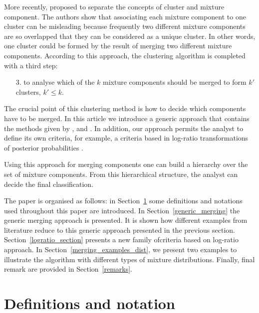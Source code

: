 \documentclass[10pt, a4paper]{article}
\begin{document}
\begin{spacing}{1.9}
More recently, \cite{lee2004combining,hennig2010methods,baudry2010combining,melnykov2013distribution,pastore2013merging} proposed to separate the concepts of cluster and mixture component. The authors show that associating each mixture component to one cluster can be misleading because frequently two different mixture components are so overlapped that they can be considered as a unique cluster. In other words, one cluster could be formed by the result of merging two different mixture components. According to this approach, the clustering algorithm is completed with a third step:

\begin{itemize}
\item[3.] to analyse which of the $k$ mixture components should be merged to form $k'$ clusters, $k' \leq k$.
\end{itemize}

The crucial point of this clustering method is how to decide which components have to be merged. In this article we introduce a generic approach that contains the methods given by \cite{baudry2010combining}, \cite{hennig2010methods} and \cite{longford2014}. In addition, our approach permits the analyst  to define its own criteria, for example, a criteria based in log-ratio transformations of posterior probabilities \citep{aitchison1986statistical}.

Using this approach for merging components one can build a hierarchy over the set of mixture components. From this hierarchical structure, the analyst can decide the final classification.

The paper is organised as follows: in Section~\ref{definitions} some definitions and notations used throughout this paper are introduced. In Section~\ref{generic_merging} the generic merging approach is presented. It is shown how different examples from literature reduce to this generic approach presented in the previous section. Section~\ref{logratio_section} presents a new family ofcriteria based on log-ratio approach. In Section~\ref{merging_examples_dist}, we present two examples to illustrate the algorithm with different types of mixture distributions. Finally, final remark are provided in Section~\ref{remarks}.

\section{Definitions and notation}\label{definitions}


\end{spacing}
\end{document}

